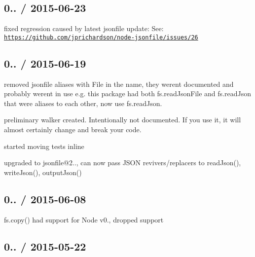\subsection*{0.. / 2015-\/06-\/23 }


\begin{DoxyItemize}
\item fixed regression caused by latest jsonfile update\+: See\+: \href{https://github.com/jprichardson/node-jsonfile/issues/26}{\tt https\+://github.\+com/jprichardson/node-\/jsonfile/issues/26}
\end{DoxyItemize}

\subsection*{0.. / 2015-\/06-\/19 }


\begin{DoxyItemize}
\item removed {\ttfamily jsonfile} aliases with {\ttfamily File} in the name, they weren\textquotesingle{}t documented and probably weren\textquotesingle{}t in use e.\+g. this package had both {\ttfamily fs.\+read\+Json\+File} and {\ttfamily fs.\+read\+Json} that were aliases to each other, now use {\ttfamily fs.\+read\+Json}.
\item preliminary walker created. Intentionally not documented. If you use it, it will almost certainly change and break your code.
\item started moving tests inline
\item upgraded to {\ttfamily jsonfile@2..}, can now pass J\+S\+ON revivers/replacers to {\ttfamily read\+Json()}, {\ttfamily write\+Json()}, {\ttfamily output\+Json()}
\end{DoxyItemize}

\subsection*{0.. / 2015-\/06-\/08 }


\begin{DoxyItemize}
\item {\ttfamily fs.\+copy()} had support for Node v0., dropped support
\end{DoxyItemize}

\subsection*{0.. / 2015-\/05-\/22 }


